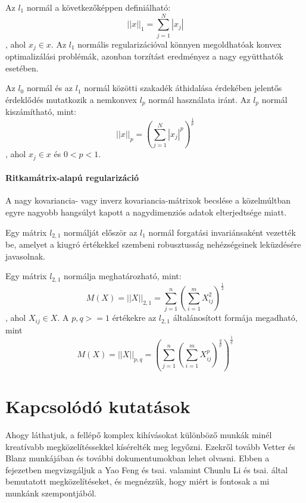 \documentclass[12pt,a4]{article}
\begin{document}
        Az $l_{1}$ normál a következőképpen definiálható:
        \begin{equation}
            ||x||_{1} = \sum_{j=1}^{N}|x_{j}|
        \end{equation}
        , ahol $x_{j} \in x$. Az $l_{1}$ normális regularizációval könnyen megoldhatóak konvex optimalizálási problémák, azonban torzítást eredményez a nagy együtthatók esetében.

        Az $l_{0}$ normál és az $l_{1}$ normál közötti szakadék áthidalása érdekében jelentős érdeklődés mutatkozik a nemkonvex $l_{p}$ normál használata iránt. Az $l_{p}$ normál kiszámítható, mint:
        \begin{equation}
            || x ||_{p} = (\sum_{j = 1}^{N}|x_{j}|^{p})^{\frac{1}{p}}
        \end{equation}
        , ahol $x_{j} \in x$ és $0 < p < 1$. 

        
        \paragraph{Ritkamátrix-alapú regularizáció}
        A nagy kovariancia- vagy inverz kovariancia-mátrixok becslése a közelmúltban egyre nagyobb hangsúlyt kapott a nagydimenziós adatok elterjedtsége miatt.

        Egy mátrix $l_{2,1}$ normálját először az $l_{1}$ normál forgatási invariánsaként vezették be, amelyet a kiugró értékekkel szembeni robusztusság nehézségeinek leküzdésére javasolnak.

        Egy mátrix $l_{2,1}$ normálja meghatározható, mint:
        \begin{equation}
            M(X) = ||X||_{2,1} = \sum_{j=1}^{n}(\sum_{i=1}^{m}X_{ij}^{2})^{\frac{1}{2}}
        \end{equation}
        , ahol $X_{ij} \in X$. A $p,q>=1$ értékekre az $l_{2,1}$ általánosított formája megadható, mint
        \begin{equation}
            M(X) = ||X||_{p,q} = (\sum_{j=1}^{n}(\sum_{i=1}^{m}X_{ij}^{p})^{\frac{q}{p}})^{\frac{1}{q}}
        \end{equation}
    
    
    \section{Kapcsolódó kutatások}

        Ahogy láthatjuk, a fellépő komplex kihívásokat különböző munkák minél kreatívabb megközelítéssekkel kísérelték meg legyőzni. Ezekről tovább \cite{blanzvetter}Vetter és Blanz  munkájában és további dokumentumokban lehet olvasni. Ebben a fejezetben megvizsgáljuk a \cite{deca}Yao Feng és tsai. valamint \cite{focus}Chunlu Li és tsai. által bemutatott megközelítéseket, és megnézzük, hogy miért is fontosak a mi munkánk szempontjából.
\end{document}
